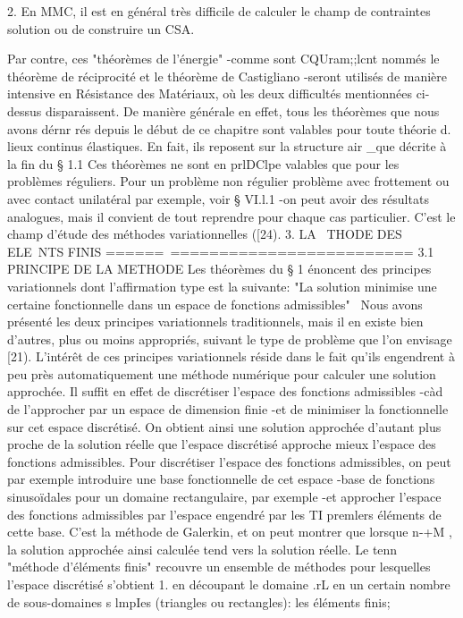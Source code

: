 {{{{{{2. 
En MMC, il est en général très difficile de calculer le champ de contrain­tes solution ou de construire un CSA. 


Par contre, ces "théorèmes de l'énergie" -comme sont CQUram;;lcnt nommés le théorème de réciprocité et le théorème de Castigliano -seront utilisés de manière intensive en Résistance des Matériaux, où les deux dif­ficultés mentionnées ci-dessus disparaissent. De manière générale en effet, tous les théorèmes que nous avons dérnr rés depuis le début de ce chapitre 
sont valables pour toute théorie d. lieux continus élastiques. En fait, 
ils reposent sur la structure air _que décrite à la fin du § 1.1 
Ces théorèmes ne sont en prlDClpe valables que pour les problèmes réguliers. Pour un problème non régulier problème avec frottement ou avec contact unilatéral par exemple, voir § VI.l.1 -on peut avoir des résultats analogues, mais il convient de tout reprendre pour chaque cas particulier. C'est le champ d'étude des méthodes variationnelles ([24). 
3. LA ~THODE DES ELE~NTS FINIS 
======~========================= 
3.1 PRINCIPE DE LA METHODE 
Les théorèmes du § 1 énoncent des principes variationnels dont l'affirmation type est la suivante: "La solution minimise une certaine fonc­tionnelle dans un espace de fonctions admissibles"~ Nous avons présenté les deux principes variationnels traditionnels, mais il en existe bien d'autres, plus ou moins appropriés, suivant le type de problème que l'on envisage [21). L'intérêt de ces principes variationnels réside dans le fait qu'ils engen­drent à peu près automatiquement une méthode numérique pour calculer une so­lution approchée. Il suffit en effet de discrétiser l'espace des fonctions admissibles -càd de l'approcher par un espace de dimension finie -et de 
minimiser la fonctionnelle sur cet espace discrétisé. On obtient ainsi une 
solution approchée d'autant plus proche de la solution réelle que l'espace discrétisé approche mieux l'espace des fonctions admissibles. 
Pour discrétiser l'espace des fonctions admissibles, on peut par exemple introduire une base fonctionnelle de cet espace -base de fonctions sinusoïdales pour un domaine rectangulaire, par exemple -et approcher l'es­pace des fonctions admissibles par l'espace engendré par les TI premlers éléments de cette base. C'est la méthode de Galerkin, et on peut montrer que lorsque n-+M , la solution approchée ainsi calculée tend vers la solution réelle. 
Le tenn~ "méthode d'éléments finis" recouvre un ensemble de métho­des pour lesquelles l'espace discrétisé s'obtient 
1. 
en découpant le domaine .rL en un certain nombre de sous-domaines s lm­pIes (triangles ou rectangles): les éléments finis; 

}}}}}}
